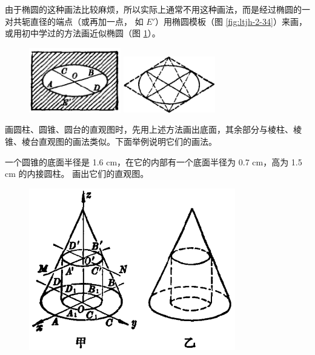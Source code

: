 \begin{enhancedline}
由于椭圆的这种画法比较麻烦，所以实际上通常不用这种画法，而是经过椭圆的一对共轭直径的端点（或再加一点，
如 $E'$）用椭圆模板（图 \ref{fig:ltjh-2-34}）来画，或用初中学过的方法画近似椭圆（图 \ref{fig:ltjh-2-35}）。

\begin{figure}[htbp]
    \centering
    \begin{minipage}[b]{7cm}
        \centering
        \includegraphics[width=4cm]{../pic/ltjh-ch2-34.png}
        \caption{}\label{fig:ltjh-2-34}
    \end{minipage}
    \qquad
    \begin{minipage}[b]{7cm}
        \centering
        \includegraphics[width=4cm]{../pic/ltjh-ch2-35.png}
        \caption{}\label{fig:ltjh-2-35}
    \end{minipage}
\end{figure}

画圆柱、圆锥、圆台的直观图时，先用上述方法画出底面，其余部分与棱柱、棱锥、棱台直观图的画法类似。下面举例说明它们的画法。


\liti 一个圆锥的底面半径是 1.6 cm，在它的内部有一个底面半径为 0.7 cm，高为 1.5 cm 的内接圆柱\footnotemark。
画出它们的直观图。

\begin{figure}[htbp]
    \centering
    \includegraphics[width=9cm]{../pic/ltjh-ch2-36.png}
    \caption{}\label{fig:ltjh-2-36}
\end{figure}


\end{enhancedline}

